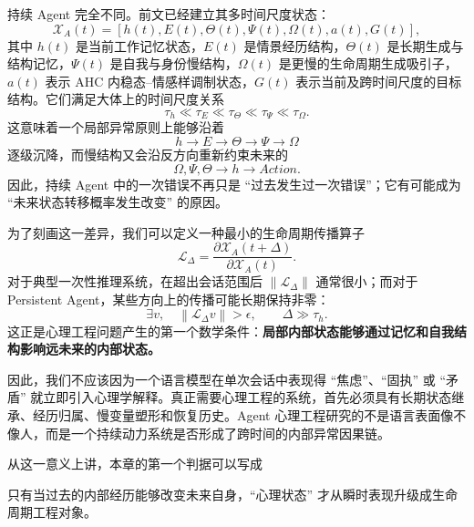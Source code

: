 持续 Agent 完全不同。前文已经建立其多时间尺度状态：
\begin{equation}
    \mathcal{X}_A(t)
    =
    \left[
    h(t),
    E(t),
    \Theta(t),
    \Psi(t),
    \Omega(t),
    a(t),
    G(t)
    \right],
\end{equation}
其中 $h(t)$ 是当前工作记忆状态，$E(t)$ 是情景经历结构，$\Theta(t)$ 是长期生成与结构记忆，$\Psi(t)$ 是自我与身份慢结构，$\Omega(t)$ 是更慢的生命周期生成吸引子，$a(t)$ 表示 AHC 内稳态--情感样调制状态，$G(t)$ 表示当前及跨时间尺度的目标结构。它们满足大体上的时间尺度关系
\begin{equation}
    \tau_h
    \ll
    \tau_E
    \ll
    \tau_{\Theta}
    \ll
    \tau_{\Psi}
    \ll
    \tau_{\Omega}.
\end{equation}
这意味着一个局部异常原则上能够沿着
\begin{equation}
    h
    \rightarrow
    E
    \rightarrow
    \Theta
    \rightarrow
    \Psi
    \rightarrow
    \Omega
\end{equation}
逐级沉降，而慢结构又会沿反方向重新约束未来的
\begin{equation}
    \Omega,\Psi,\Theta
    \rightarrow
    h
    \rightarrow
    Action.
\end{equation}
因此，持续 Agent 中的一次错误不再只是 ``过去发生过一次错误''；它有可能成为 ``未来状态转移概率发生改变'' 的原因。

为了刻画这一差异，我们可以定义一种最小的生命周期传播算子
\begin{equation}
    \mathcal{L}_{\Delta}
    =
    \frac{\partial \mathcal{X}_A(t+\Delta)}
    {\partial \mathcal{X}_A(t)}.
\end{equation}
对于典型一次性推理系统，在超出会话范围后 $\|\mathcal{L}_{\Delta}\|$ 通常很小；而对于 Persistent Agent，某些方向上的传播可能长期保持非零：
\begin{equation}
    \exists v,\quad
    \left\|
    \mathcal{L}_{\Delta}v
    \right\|
    > \epsilon,
    \qquad
    \Delta \gg \tau_h.
\end{equation}
这正是心理工程问题产生的第一个数学条件：\textbf{局部内部状态能够通过记忆和自我结构影响远未来的内部状态。}

因此，我们不应该因为一个语言模型在单次会话中表现得 ``焦虑''、``固执'' 或 ``矛盾'' 就立即引入心理学解释。真正需要心理工程的系统，首先必须具有长期状态继承、经历归属、慢变量塑形和恢复历史。Agent 心理工程研究的不是语言表面像不像人，而是一个持续动力系统是否形成了跨时间的内部异常因果链。

从这一意义上讲，本章的第一个判据可以写成
\begin{statementbox}
\centering
{}
\end{statementbox}
只有当过去的内部经历能够改变未来自身，``心理状态'' 才从瞬时表现升级成生命周期工程对象。

